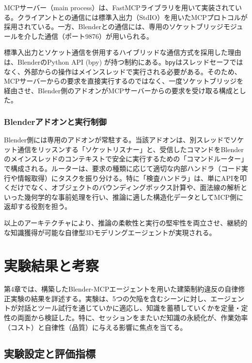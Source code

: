 \documentclass[dvipdfmx, a4paper, 9pt]{deimj}
\begin{document}
MCPサーバー（main process）は、FastMCPライブラリを用いて実装されている。クライアントとの通信には標準入出力（StdIO）を用いたMCPプロトコルが採用されている。一方、Blenderとの通信には、専用のソケットブリッジモジュールを介した通信（ポート9876）が用いられる。

標準入出力とソケット通信を併用するハイブリッドな通信方式を採用した理由は、BlenderのPython API (bpy) が持つ制約にある。\texttt{bpy}はスレッドセーフではなく、外部からの操作はメインスレッドで実行される必要がある。そのため、MCPサーバーからの要求を直接実行するのではなく、一度ソケットブリッジを経由させ、Blender側のアドオンがMCPサーバーからの要求を受け取る構成とした。

\subsubsection{Blenderアドオンと実行制御}

Blender側には専用のアドオンが常駐する。当該アドオンは、別スレッドでソケット通信をリッスンする「ソケットリスナー」と、受信したコマンドをBlenderのメインスレッドのコンテキストで安全に実行するための「コマンドルーター」で構成される。ルーターは、要求の種類に応じて適切な内部ハンドラ（コード実行や情報取得）にタスクを振り分ける。特に「検査ハンドラ」は、単にAPIを叩くだけでなく、オブジェクトのバウンディングボックス計算や、面法線の解析といった幾何学的な事前処理を行い、推論に適した構造化データとしてMCP側に返却する役割を担う。

以上のアーキテクチャにより、推論の柔軟性と実行の堅牢性を両立させ、継続的な知識獲得が可能な自律型3Dモデリングエージェントが実現される。

\section{実験結果と考察}

第4章では、構築したBlender-MCPエージェントを用いた建築制約違反の自律修正実験の結果を詳述する。実験は、5つの欠陥を含むシーンに対し、エージェントが対話とツール試行を通じていかに適応し、知識を蓄積していくかを定量・定性の両面から検証した。特に、セッションをまたいだ知識の永続化が、作業効率（コスト）と自律性（品質）に与える影響に焦点を当てる。

\subsection{実験設定と評価指標}
\end{document}

